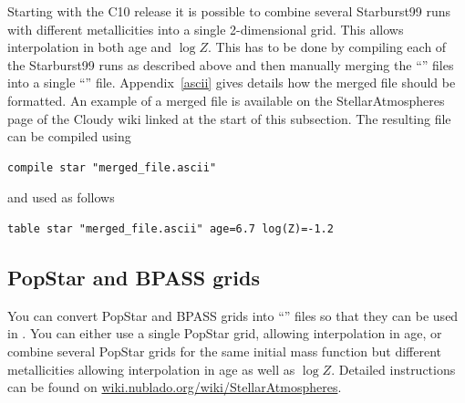 Starting with the C10 release it is possible to combine several
Starburst99 runs with different metallicities into a single 2-dimensional
grid. This allows interpolation in both age and $\log Z$. This has
to be done by compiling each of the Starburst99 runs as described above
and then manually merging the ``'' files into a single
``'' file. Appendix~\ref{ascii} gives details how the merged
file should be formatted. An example of a merged file is available on the
StellarAtmospheres page of the Cloudy wiki linked at the start of this subsection.
The resulting file can be compiled using
\begin{verbatim}
compile star "merged_file.ascii"
\end{verbatim}
and used as follows
\begin{verbatim}
table star "merged_file.ascii" age=6.7 log(Z)=-1.2
\end{verbatim}

\subsection{PopStar and BPASS grids}

You can convert PopStar and BPASS grids into ``'' files so
that they can be used in \Cloudy. You can either use a single PopStar grid,
allowing interpolation in age, or combine several PopStar grids for the same
initial mass function but different metallicities allowing interpolation in
age as well as $\log Z$. Detailed instructions can be found on
\href{http://wiki.nublado.org/wiki/StellarAtmospheres}{wiki.nublado.org/wiki/StellarAtmospheres}.
